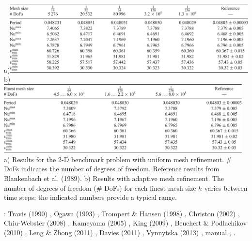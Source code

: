 \begin{center}
a)\includegraphics[width=13cm]{images/benchmark_blbc89/krhb12a}
b)\includegraphics[width=13cm]{images/benchmark_blbc89/krhb12b}\\
{\captionfont 
a) Results for the 2-D benchmark problem with uniform mesh refinement. 
\# DoFs indicates the number of degrees of freedom.
Reference results from Blankenbach et al. (1989).
b) Results with adaptive mesh refinement. The number of degrees of freedom (\# DoFs) for
each finest mesh size $h$ varies between time steps; 
the indicated numbers provide a typical range.}
\end{center}

\Literature: Travis \etal (1990) \cite{trab90},
Ogawa (1993) \cite{ogaw93},
Trompert \& Hansen (1998) \cite{trha98},
Christon \etal (2002) \cite{chgs02},
Chiu-Webster \etal (2008) \cite{chhl08},
Kameyama \etal (2005) \cite{kaks05},
King (2009) \cite{king09},
Beuchert \& Podlachikov (2010) \cite{bepo10},
Leng \& Zhong (2011) \cite{lezh11},
Davies \etal (2011) \cite{dawk11},
Vynnytska \etal (2013) \cite{vyrc13},
\aspect{} manual \cite{aspectmanual},
.



